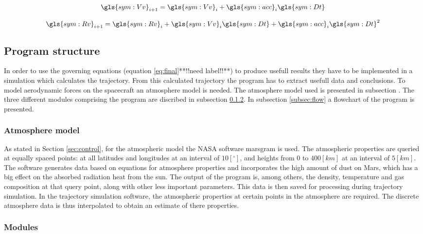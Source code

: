 \begin{equation} \label{eq:Vi}
\gls{sym:Vv}_{i+1} = \gls{sym:Vv}_i + \gls{sym:acc}_i \gls{sym:Dt}
\end{equation}

\begin{equation} \label{eq:Ri}
\gls{sym:Rv}_{i+1} = \gls{sym:Rv}_i + \gls{sym:Vv}_i \gls{sym:Dt} + \gls{sym:acc}_i \gls{sym:Dt}^2
\end{equation}

\subsection{Program structure}\label{sec:prog_struct}

In order to use the governing equations (equation \ref{eq:final}**!!need label!!**) to produce usefull results they have to be implemented in a simulation which calculates the trajectory. From this calculated trajectory the program has to extract usefull data and conclusions. To model aerodynamic forces on the spacecraft an atmosphere model is needed. The atmosphere model used is presented in subsection \label{subsec:atmos}. The three different modules comprising the program are discribed in subsection \ref{subsec:modules}. In subsection \ref{subsec:flow} a flowchart of the program is presented.

\subsubsection{Atmosphere model}\label{subsec:atmos}
As stated in Section \ref{sec:control}, for the atmospheric model the NASA software \gls{marsgram} is used. The atmospheric properties are queried at equally spaced points: at all latitudes and longitudes at an interval of $10 [^\circ]$, and heights from $0$ to $400 [km]$ at an interval of $5 [km]$. The software generates data based on equations for atmosphere properties and incorporates the high amount of dust on Mars, which has a big effect on the absorbed radiation heat from the sun. The output of the program is, among others, the density, temperature and gas composition at that query point, along with other less important parameters. \cite{Justus2001}
This data is then saved for processing during trajectory simulation. In the trajectory simulation software, the atmospheric properties at certain points in the atmosphere are required. The discrete atmosphere data is thus interpolated to obtain an estimate of there properties. 

\subsubsection{Modules} \label{subsec:modules}

